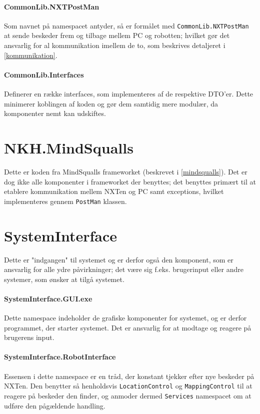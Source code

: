 \paragraph{CommonLib.NXTPostMan}
Som navnet på namespacet antyder, så er formålet med \lstinline[style=csharp]!CommonLib.NXTPostMan! at sende beskeder frem og tilbage mellem PC og robotten; hvilket gør det ansvarlig for al kommunikation imellem de to, som beskrives detaljeret i \cref{kommunikation}.

\paragraph{CommonLib.Interfaces}
Definerer en række interfaces, som implementeres af de respektive DTO'er.
Dette minimerer koblingen af koden og gør dem samtidig mere modulær, da komponenter nemt kan udskiftes.

\section{NKH.MindSqualls}\label{arkitektur:mindsqualls}
Dette er koden fra MindSqualls frameworket (beskrevet i \cref{mindsqualls}).
Det er dog ikke alle komponenter i frameworket der benyttes; det benyttes primært til at etablere kommunikation mellem NXTen og PC samt exceptions, hvilket implementeres gennem \lstinline[style=csharp]|PostMan| klassen.

\section{SystemInterface}\label{arkitektur:systeminterface}
Dette er "indgangen" til systemet og er derfor også den komponent, som er ansvarlig for alle ydre påvirkninger; det være sig f.eks. brugerinput eller andre systemer, som ønsker at tilgå systemet.

\paragraph{SystemInterface.GUI.exe}
Dette namespace indeholder de grafiske komponenter for systemet, og er derfor programmet, der starter systemet.
Det er ansvarlig for at modtage og reagere på brugerens input.

\paragraph{SystemInterface.RobotInterface}
Essensen i dette namespace er en tråd, der konstant tjekker efter nye beskeder på NXTen.
Den benytter så henholdsvis \lstinline[style=csharp]|LocationControl| og \lstinline[style=csharp]|MappingControl| til at reagere på beskeder den finder, og anmoder dermed \lstinline[style=csharp]!Services! namespacet om at udføre den pågældende handling.

